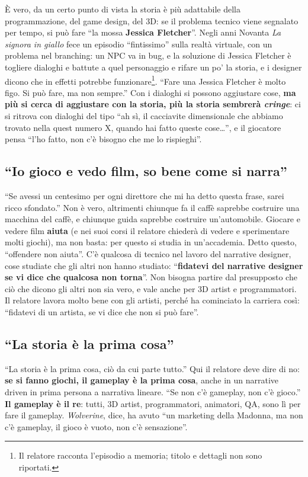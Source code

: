 È vero, da un certo punto di vista la storia è più adattabile della
programmazione, del game design, del 3D: se il problema tecnico viene
segnalato per tempo, si può fare ``la mossa \textbf{Jessica Fletcher}''.
Negli anni Novanta \emph{La signora in giallo} fece un episodio
``fintissimo'' sulla realtà virtuale, con un problema nel branching: un NPC va
in bug, e la soluzione di Jessica Fletcher è togliere dialoghi e battute a
quel personaggio e rifare un po' la storia, e i designer dicono che in effetti
potrebbe funzionare\footnote{Il relatore racconta l'episodio a memoria;
titolo e dettagli non sono riportati.}. ``Fare una Jessica Fletcher è molto
figo. Si può fare, ma non sempre.'' Con i dialoghi si possono aggiustare
cose, \textbf{ma più si cerca di aggiustare con la storia, più la storia
sembrerà \emph{cringe}}: ci si ritrova con dialoghi del tipo ``ah sì, il
cacciavite dimensionale che abbiamo trovato nella quest numero X, quando hai
fatto queste cose\ldots'', e il giocatore pensa ``l'ho fatto, non c'è bisogno
che me lo rispieghi''.

\subsection{``Io gioco e vedo film, so bene come si narra''}

``Se avessi un centesimo per ogni direttore che mi ha detto questa frase,
sarei ricco sfondato.'' Non è vero, altrimenti chiunque fa il caffè saprebbe
costruire una macchina del caffè, e chiunque guida saprebbe costruire
un'automobile. Giocare e vedere film \textbf{aiuta} (e nei suoi corsi il
relatore chiederà di vedere e sperimentare molti giochi), ma non basta: per
questo si studia in un'accademia. Detto questo, ``offendere non aiuta''. C'è
qualcosa di tecnico nel lavoro del narrative designer, cose studiate che gli
altri non hanno studiato: ``\textbf{fidatevi del narrative designer se vi dice
che qualcosa non torna}''. Non bisogna partire dal presupposto che ciò che
dicono gli altri non sia vero, e vale anche per 3D artist e programmatori. Il
relatore lavora molto bene con gli artisti, perché ha cominciato la carriera
così: ``fidatevi di un artista, se vi dice che non si può fare''.

\subsection{``La storia è la prima cosa''}

``La storia è la prima cosa, ciò da cui parte tutto.'' Qui il relatore deve
dire di no: \textbf{se si fanno giochi, il gameplay è la prima cosa}, anche in
un narrative driven in prima persona a narrativa lineare. ``Se non c'è
gameplay, non c'è gioco.'' \textbf{Il gameplay è il re}: tutti, 3D artist,
programmatori, animatori, QA, sono lì per fare il gameplay. \emph{Wolverine},
dice, ha avuto ``un marketing della Madonna, ma non c'è gameplay, il gioco è
vuoto, non c'è sensazione''.

